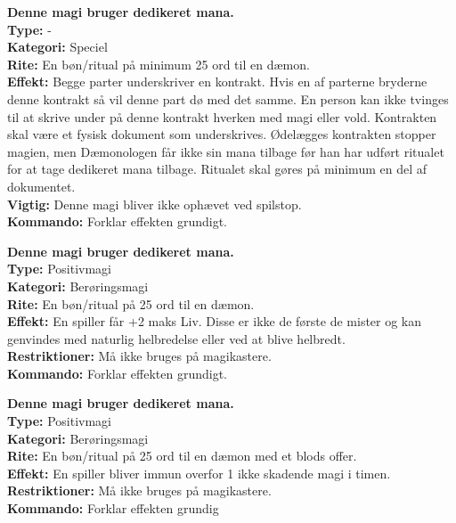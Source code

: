 \begin{sjæl*}
\textbf{Denne magi bruger dedikeret mana.}\\
\textbf{Type:} - \\
\textbf{Kategori:} Speciel\\
\textbf{Rite:} En bøn/ritual på minimum 25 ord til en dæmon.\\
\textbf{Effekt:} Begge parter underskriver en kontrakt. Hvis en af parterne bryderne denne kontrakt så vil denne part dø med det samme. En person kan ikke tvinges til at skrive under på denne kontrakt hverken med magi eller vold. Kontrakten skal være et fysisk dokument som underskrives. Ødelægges kontrakten stopper magien, men Dæmonologen får ikke sin mana tilbage før han har udført ritualet for at tage dedikeret mana tilbage. Ritualet skal gøres på minimum en del af dokumentet.\\
\textbf{Vigtig:} Denne magi bliver ikke ophævet ved spilstop.\\
\textbf{Kommando:} Forklar effekten grundigt.
\end{sjæl*}


\begin{sjæl*}[Følelsesløs]
\textbf{Denne magi bruger dedikeret mana.}\\
\textbf{Type:} Positivmagi\\
\textbf{Kategori:} Berøringsmagi\\
\textbf{Rite:} En bøn/ritual på 25 ord til en dæmon.\\
\textbf{Effekt:} En spiller får +2 maks Liv. Disse er ikke de første de mister og kan genvindes med naturlig helbredelse eller ved at blive helbredt.\\
\textbf{Restriktioner:} Må ikke bruges på magikastere.\\
\textbf{Kommando:} Forklar effekten grundigt.
\end{sjæl*}

\begin{sjæl*}
\textbf{Denne magi bruger dedikeret mana.}\\
\textbf{Type:} Positivmagi\\ 
\textbf{Kategori:} Berøringsmagi\\
\textbf{Rite:} En bøn/ritual på 25 ord til en dæmon med et blods offer.\\
\textbf{Effekt:} En spiller bliver immun overfor 1 ikke skadende magi i timen.\\
\textbf{Restriktioner:} Må ikke bruges på magikastere.\\
\textbf{Kommando:} Forklar effekten grundig
\end{sjæl*}

